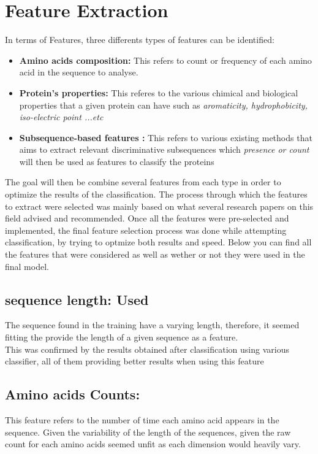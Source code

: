 \documentclass{bioinfo}
\begin{document}
\section{Feature Extraction}

In terms of Features, three differents types of features can be identified: 
\begin{itemize}
 	\item \textbf{Amino acids composition: } This refers to count or frequency of each amino acid in the sequence to analyse. 
	\item \textbf{Protein's properties: } This referes to the various chimical and biological properties that a given protein can have such as \textit{aromaticity, hydrophobicity, iso-electric point ...etc}
	\item \textbf{Subsequence-based features : } This refers to various existing methods that aims to extract relevant discriminative subsequences which \textit{presence or count} will then be used as features to classify the proteins
\end{itemize}

The goal will then be combine several features from each type in order to optimize the results of the classification. The process through which the features to extract were selected was mainly based on what several research papers on this field advised and recommended. Once all the features were pre-selected and implemented, the final feature selection process was done while attempting classification, by trying to optmize both results and speed. Below you can find all the features that were considered as well as wether or not they were used in the final model. 

\subsection{sequence length: \textbf{Used}}
The sequence found in the training have a varying length, therefore, it seemed fitting the provide the length of a given sequence as a feature. \\
This was confirmed by the results obtained after classification using various classifier, all of them providing better results when using this feature 

\subsection{Amino acids Counts: }
This feature refers to the number of time each amino acid appears in the sequence.
Given the variability of the length of the sequences, given the raw count for each amino acids seemed unfit as each dimension would heavily vary.
\end{document}
